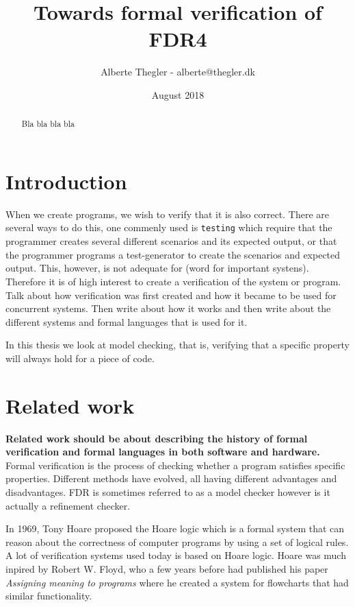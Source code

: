 \documentclass[a4paper]{article}
\title{Towards formal verification of FDR4}
\author{Alberte Thegler - alberte@thegler.dk}
\date{August 2018}
\begin{document}
\maketitle

\begin{abstract}
\begin{doublespace}
Bla bla 
bla bla


\end{doublespace}
\end{abstract}



\newpage
\tableofcontents

\newpage
\listoftodos
\newpage
{}
\section{Introduction}
When we create programs, we wish to verify that it is also correct. There are several ways to do this, one commenly used is \texttt{testing} which require that the programmer creates several different scenarios and its expected output, or that the programmer programs a test-generator to create the scenarios and expected output. This, however, is not adequate for (word for important systens). Therefore it is of high interest to create a verification of the system or program.\\
Talk about how verification was first created and how it became to be used for concurrent systems. Then write about how it works and then write about the different systems and formal languages that is used for it. 


In this thesis we look at model checking, that is, verifying that a specific property will always hold for a piece of code.
\section{Related work}
\textbf{Related work should be about describing the history of formal verification and formal languages in both software and hardware.}
Formal verification is the process of checking whether a program satisfies specific properties. Different methods have evolved, all having different advantages and disadvantages. FDR is sometimes referred to as a model checker however is it actually a refinement checker. 


In 1969, Tony Hoare proposed the Hoare logic\cite{Hoare1969} which is a formal system that can reason about the correctness of computer programs by using a set of logical rules. A lot of verification systems used today is based on Hoare logic. Hoare was much inpired by Robert W. Floyd, who a few years before had published his paper \textit{Assigning meaning to programs}\cite{Floyd1967} where he created a system for flowcharts that had similar functionality.
\end{document}
